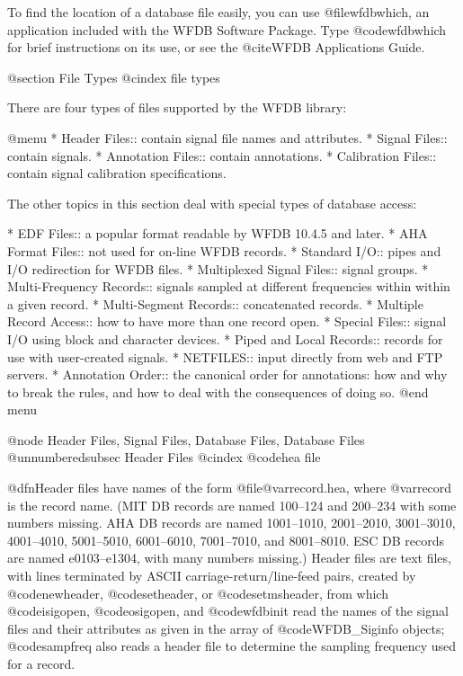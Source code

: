 {{{{{{{{{To find the location of a database file easily, you can use @file{wfdbwhich},
an application included with the WFDB Software Package.  Type
@code{wfdbwhich} for brief instructions on its use, or see the @cite{WFDB
Applications Guide}.

@section File Types
@cindex file types

There are four types of files supported by the WFDB library:

@menu
* Header Files::		contain signal file names and attributes.
* Signal Files::		contain signals.
* Annotation Files::		contain annotations.
* Calibration Files::		contain signal calibration specifications.

The other topics in this section deal with special types of database access:

* EDF Files::                   a popular format readable by WFDB 10.4.5 and
                                 later.
* AHA Format Files::		not used for on-line WFDB records.
* Standard I/O::		pipes and I/O redirection for WFDB files.
* Multiplexed Signal Files::	signal groups.
* Multi-Frequency Records::     signals sampled at different frequencies within
                                 within a given record.
* Multi-Segment Records::       concatenated records.
* Multiple Record Access::	how to have more than one record open.
* Special Files::		signal I/O using block and character devices.
* Piped and Local Records::	records for use with user-created signals.
* NETFILES::			input directly from web and FTP servers.
* Annotation Order::            the canonical order for annotations:
                                 how and why to break the rules, and how
                                 to deal with the consequences of doing so.
@end menu

@node     Header Files, Signal Files, Database Files, Database Files
@unnumberedsubsec Header Files
@cindex @code{hea} file

@dfn{Header files} have names of the form @file{@var{record}.hea}, where
@var{record} is the record name.  (MIT DB records are named 100--124 and
200--234 with some numbers missing.  AHA DB records are named
1001--1010, 2001--2010, 3001--3010, 4001--4010, 5001--5010, 6001--6010,
7001--7010, and 8001--8010.  ESC DB records are named e0103--e1304, with
many numbers missing.)  Header files are text files, with lines
terminated by ASCII carriage-return/line-feed pairs, created by
@code{newheader}, @code{setheader}, or @code{setmsheader}, from which
@code{isigopen}, @code{osigopen}, and @code{wfdbinit} read the names of
the signal files and their attributes as given in the array of
@code{WFDB_Siginfo} objects; @code{sampfreq} also reads a header
file to determine the sampling frequency used for a record.

}}}}}}}}}
